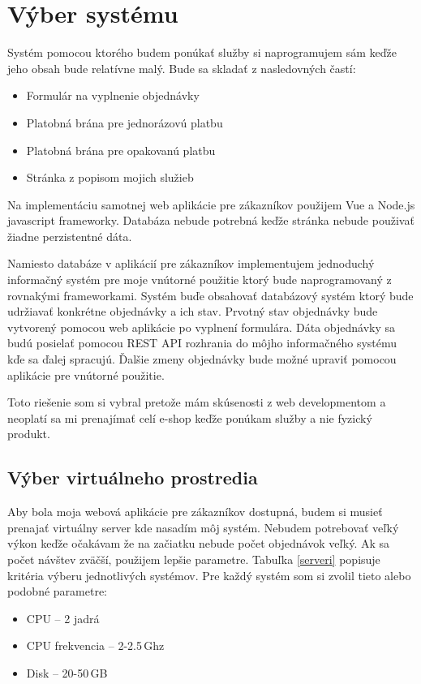 \chapter{Výber systému}
\label{ch:vyber}
Systém pomocou ktorého budem ponúkať služby si naprogramujem sám keďže jeho obsah bude relatívne malý. Bude sa skladať z nasledovných častí:

\begin{itemize}
  \item Formulár na vyplnenie objednávky
  \item Platobná brána pre jednorázovú platbu
  \item Platobná brána pre opakovanú platbu
  \item Stránka z popisom mojich služieb
\end{itemize}

Na implementáciu samotnej web aplikácie pre zákazníkov použijem Vue \cite{vue} a Node.js \cite{Node} javascript frameworky. Databáza nebude potrebná keďže stránka nebude použivať žiadne perzistentné dáta.

Namiesto databáze v aplikácií pre zákazníkov implementujem jednoduchý informačný systém pre moje vnútorné použitie ktorý bude naprogramovaný z rovnakými frameworkami. Systém buďe obsahovať databázový systém ktorý bude udržiavať konkrétne objednávky a ich stav. Prvotný stav objednávky bude vytvorený pomocou web aplikácie po vyplnení formulára. Dáta objednávky sa budú posielať pomocou REST API rozhrania do môjho informačného systému kďe sa ďalej spracujú. Ďalšie zmeny objednávky bude možné upraviť pomocou aplikácie pre vnútorné použitie. 

Toto riešenie som si vybral pretože mám skúsenosti z web developmentom a neoplatí sa mi prenajímať celí e-shop keďže ponúkam služby a nie fyzický produkt.

\section{Výber virtuálneho prostredia}
\label{vyber}

Aby bola moja webová aplikácie pre zákazníkov dostupná, budem si musieť prenajať virtuálny server kde nasadím môj systém. Nebudem potrebovať veľký výkon keďže očakávam že na začiatku nebude počet objednávok veľký. Ak sa počet návštev zväčší, použijem lepšie parametre. Tabuľka \ref{serveri} popisuje kritéria výberu jednotlivých systémov. Pre každý systém som si zvolil tieto alebo podobné parametre:

\begin{itemize}
  \item CPU -- 2 jadrá
  \item CPU frekvencia -- 2-2.5\,Ghz
  \item Disk -- 20-50\,GB
\end{itemize}

